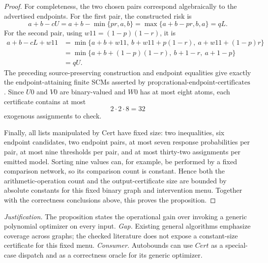 \documentclass{article}
\begin{document}
\begin{proof}
For completeness, the two chosen pairs correspond algebraically to the advertised endpoints.  For the first pair, the constructed risk is
\[
a+b-cU
=a+b-\min\{pr,a,b\}
=\max\{a+b-pr,b,a\}
=qL.
\]
For the second pair, using \(w11=(1-p)(1-r)\), it is
\[
\begin{aligned}
a+b-cL+w11
&=\min\bigl\{a+b+w11,\ b+w11+p(1-r),\ a+w11+(1-p)r\bigr\}\\
&=\min\bigl\{a+b+(1-p)(1-r),\ b+1-r,\ a+1-p\bigr\}\\
&=qU.
\end{aligned}
\]
The preceding source-preserving construction and endpoint equalities give exactly the endpoint-attaining finite SCMs asserted by \(\text{prop:rational-endpoint-certificates}\).  Since \(U0\) and \(V0\) are binary-valued and \(W0\) has at most eight atoms, each certificate contains at most
\[
2\cdot2\cdot8=32
\]
exogenous assignments to check.

Finally, all lists manipulated by \(\mathrm{Cert}\) have fixed size: two inequalities, six endpoint candidates, two endpoint pairs, at most seven response probabilities per pair, at most nine thresholds per pair, and at most thirty-two assignments per emitted model.  Sorting nine values can, for example, be performed by a fixed comparison network, so its comparison count is constant.  Hence both the arithmetic-operation count and the output-certificate size are bounded by absolute constants for this fixed binary graph and intervention menu.  Together with the correctness conclusions above, this proves the proposition.
\end{proof}
\par\smallskip\noindent \textit{Justification.} The proposition states the operational gain over invoking a generic polynomial optimizer on every input. \textit{Gap.} Existing general algorithms emphasize coverage across graphs; the checked literature does not expose a constant-size certificate for this fixed menu. \textit{Consumer.} Autobounds can use \(Cert\) as a special-case dispatch and as a correctness oracle for its generic optimizer.
\end{document}
